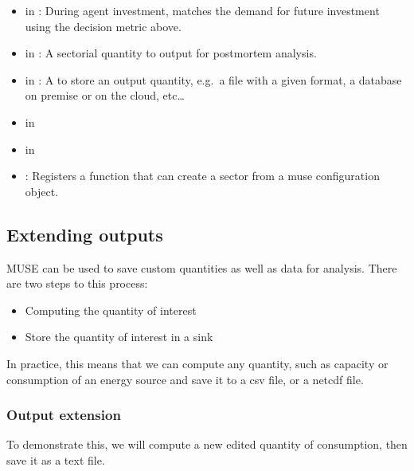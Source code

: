 \documentclass[letterpaper,10pt,english]{sphinxmanual}
\begin{document}
\begin{itemize}
\item {} 
 in : During agent investment, matches the demand for future investment using the decision metric above.

\item {} 
 in : A sectorial quantity to output for postmortem analysis.

\item {} 
 in : A  to store an output quantity, e.g. a file with a given format, a database on premise or on the cloud, etc…

\item {} 
 in 

\item {} 
 in 

\item {} 
: Registers a function that can create a sector from a muse configuration object.

\end{itemize}


\subsection{Extending outputs}
\label{\detokenize{advanced-guide/extending-muse:Extending-outputs}}
MUSE can be used to save custom quantities as well as data for analysis. There are two steps to this process:
\begin{itemize}
\item {} 
Computing the quantity of interest

\item {} 
Store the quantity of interest in a sink

\end{itemize}

In practice, this means that we can compute any quantity, such as capacity or consumption of an energy source and save it to a csv file, or a netcdf file.


\subsubsection{Output extension}
\label{\detokenize{advanced-guide/extending-muse:Output-extension}}
To demonstrate this, we will compute a new edited quantity of consumption, then save it as a text file.
\end{document}
